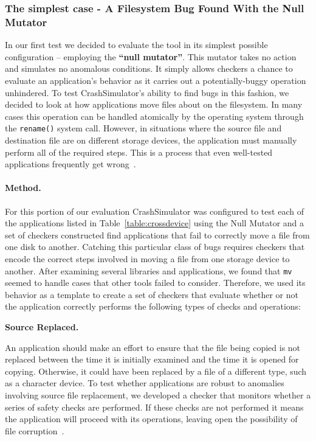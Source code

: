 \subsubsection{The simplest case - A Filesystem Bug Found With the Null Mutator}

In our first test we decided to evaluate the tool in its simplest possible
configuration -- employing the {\bf ``null mutator''}.
This mutator takes no action and simulates no anomalous conditions.
It simply allows checkers
a chance to evaluate an application's behavior
as it carries out a potentially-buggy operation unhindered.
To test CrashSimulator's ability to find bugs
in this fashion, we decided to look at how applications
move files about on the filesystem.
In many cases this operation can be handled
atomically by the operating system
through the {\tt rename()} system call.
However,
in situations where the source file and destination file
are on different storage devices,
the application must
manually perform all of the required steps.
This is a process
that even well-tested applications
frequently get wrong~\cite{PHPRenameBug,PythonShutilBug,NodejsCopyBug}.

\paragraph{Method.}  For this portion of our evaluation
CrashSimulator was configured
to test each of the applications listed in Table~\ref{table:crossdevice}
using the Null Mutator and a set of checkers constructed find applications
that fail to correctly move a file from one disk to another.
Catching this particular class of bugs requires
checkers that encode the correct steps involved in moving a file from one
storage device to another.
After examining several libraries and applications,
we found that
{\tt mv} seemed to handle cases that other tools failed to consider.
Therefore, we
used its behavior as a template to create a set of checkers
that evaluate whether or not
the application correctly performs the following
types of checks and operations:

{\bf Source Replaced.}

An application should make an effort
to ensure that the file being copied
is not replaced between the time it is initially examined
and the time it is opened for copying.
Otherwise,
it could have been replaced by a file of a different type,
such as a character device.
To test whether applications are robust
to anomalies involving source file replacement,
we developed a checker that monitors whether a series of safety checks
are performed.
If these checks are not performed it
means the application will proceed with its operations,
leaving open the possibility of file corruption~\cite{PythonShutilBug}.

